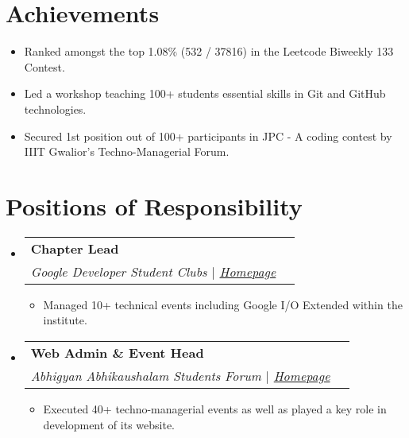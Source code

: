 \documentclass[letterpaper,11pt]{article}
\makeatletter
\newcommand{\resumeItem}[1]{
  \item\small{
    {#1 \vspace{-2pt}}
  }
}
\newcommand{\resumeSubheading}[4]{
  \vspace{-2pt}\item
    \begin{tabular*}{1.0\textwidth}[t]{l@{\extracolsep{\fill}}r}
      \textbf{#1} & \textbf{\small #2} \\
      \textit{\small#3} & \textit{\small #4} \\
    \end{tabular*}\vspace{-7pt}
}
\newcommand{\resumeSubHeadingListStart}{\begin{itemize}[leftmargin=0.0in, label={}]}
\newcommand{\resumeSubHeadingListEnd}{\end{itemize}}
\newcommand{\resumeItemListStart}{\begin{itemize}}
\newcommand{\resumeItemListEnd}{\end{itemize}\vspace{-5pt}}
\makeatother
\begin{document}
\section{Achievements}
    \resumeSubHeadingListStart
            \resumeItemListStart
                \resumeItem{Ranked amongst the top 1.08\% (532 / 37816) in the Leetcode Biweekly 133 Contest.}
                \resumeItem{Led a workshop teaching 100+ students essential skills in Git and GitHub technologies.}
                \resumeItem{Secured 1st position out of 100+ participants in JPC - A coding contest by IIIT Gwalior's Techno-Managerial Forum.}
            \resumeItemListEnd
    \resumeSubHeadingListEnd

    
\section{Positions of Responsibility}
    \resumeSubHeadingListStart
        \resumeSubheading
          {Chapter Lead}{}
          {Google Developer Student Clubs $|$ \textcolor{OliveGreen}{\href{https://gdsc.community.dev/atal-bihari-vajpayee-indian-institute-of-information-technology-and-management-abv-iiitm-gwalior}{Homepage}}}{}
          \resumeItemListStart
            \resumeItem{Managed 10+ technical events including Google I/O Extended within the institute.}
          \resumeItemListEnd 

        \resumeSubheading
          {Web Admin \& Event Head}{}
          {Abhigyan Abhikaushalam Students Forum $|$ \textcolor{OliveGreen}{\href{https://www.aasf.in/}{Homepage}}}{}
          \resumeItemListStart
            \resumeItem{Executed 40+ techno-managerial events as well as played a key role in development of its website.}
          \resumeItemListEnd         
    \resumeSubHeadingListEnd
\end{document}
